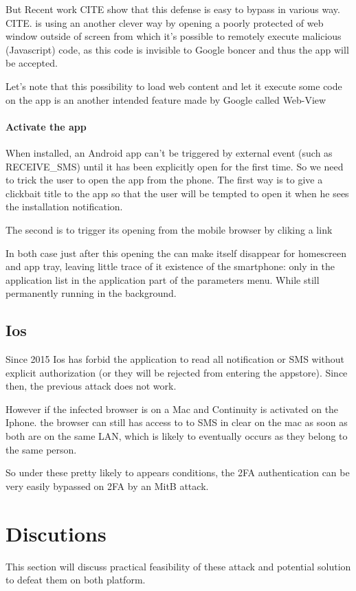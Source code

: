 \documentclass[11pt, a4paper,twocolumn]{article}
\begin{document}
But Recent work CITE show that this defense is easy to bypass in various way. CITE. \cite{Base} is using an another clever way by opening a poorly protected of web window outside of screen from which it's possible to remotely execute malicious (Javascript) code, as this code is invisible to Google boncer and thus the app will be accepted.

Let's note that this possibility to load web content and let it execute some code on the app is an another intended feature made by Google called Web-View

\paragraph{Activate the app} When installed, an Android app can't be triggered by external event (such as RECEIVE\_SMS) until it has been explicitly open for the first time. So we need to trick the user to open the app from the phone. The 
first way is to give a clickbait title to the app so that the user will be tempted to open it when he sees the installation notification.

The second is to trigger its opening from the mobile browser by cliking a link

In both case just after this opening the can make itself disappear for homescreen and app tray, leaving little trace of it existence of the smartphone: only in the application list in the application part of the parameters menu. While still permanently running in the background.

\subsection{Ios}
Since 2015 Ios has forbid the application to read all notification or SMS without explicit authorization (or they will be rejected from entering the appstore). 
Since then, the previous attack does not work. 

However if the infected browser is on a Mac and Continuity is activated on the Iphone. the browser can still has access to to SMS in clear on the mac as soon as both are on the same LAN, which is likely to eventually occurs as they belong to the same person. 

So under these pretty likely to appears conditions, the 2FA authentication can be very easily bypassed on 2FA by an MitB attack.


\section{Discutions} 
This section will discuss practical feasibility of these attack and potential solution to defeat them on both platform. 
\end{document}
